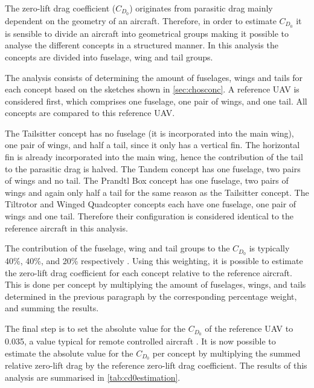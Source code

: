The zero-lift drag coefficient ($C_{D_{0}}$) originates from parasitic drag mainly dependent on the geometry of an aircraft. Therefore, in order to estimate $C_{D_{0}}$ it is sensible to divide an aircraft into geometrical groups making it possible to analyse the different concepts in a structured manner. In this analysis the concepts are divided into fuselage, wing and tail groups.

The analysis consists of determining the amount of fuselages, wings and tails for each concept based on the sketches shown in \autoref{sec:chosconc}. A reference UAV is considered first, which comprises one fuselage, one pair of wings, and one tail. All concepts are compared to this reference UAV.

The Tailsitter concept has no fuselage (it is incorporated into the main wing), one pair of wings, and half a tail, since it only has a vertical fin. The horizontal fin is already incorporated into the main wing, hence the contribution of the tail to the parasitic drag is halved. The Tandem concept has one fuselage, two pairs of wings and no tail. The Prandtl Box concept has one fuselage, two pairs of wings and again only half a tail for the same reason as the Tailsitter concept. The Tiltrotor and Winged Quadcopter concepts each have one fuselage, one pair of wings and one tail. Therefore their configuration is considered identical to the reference aircraft in this analysis.

The contribution of the fuselage, wing and tail groups to the $C_{D_{0}}$ is typically 40\%, 40\%, and 20\% respectively \cite{drag_ch3}. Using this weighting, it is possible to estimate the zero-lift drag coefficient for each concept relative to the reference aircraft. This is done per concept by multiplying the amount of fuselages, wings, and tails determined in the previous paragraph by the corresponding percentage weight, and summing the results.

The final step is to set the absolute value for the $C_{D_{0}}$ of the reference UAV to 0.035, a value typical for remote controlled aircraft \cite{drag_ch3}. It is now possible to estimate the absolute value for the $C_{D_{0}}$ per concept by multiplying the summed relative zero-lift drag by the reference zero-lift drag coefficient. The results of this analysis are summarised in \autoref{tab:cd0estimation}.

